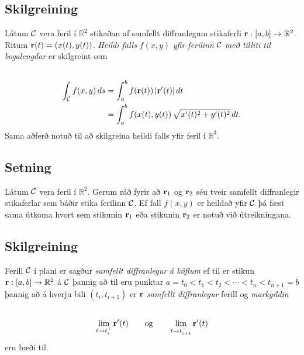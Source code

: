\documentclass[a4paper,10pt,icelandic]{sphinxmanual}
\begin{document}
\subsection{Skilgreining}
\label{Kafli5:id5}
Látum \(\cal C\) vera feril í \({\mathbb  R}^2\) stikaðan af
samfellt diffranlegum stikaferli
\(\mbox{${\bf r}$}:[a,b]\rightarrow{\mathbb  R}^2\). Ritum
\(\mbox{${\bf r}$}(t)=(x(t),y(t))\). \emph{Heildi falls} \(f(x,y)\)
\emph{yfir ferilinn} \(\cal C\) \emph{með tilliti til bogalengdar} er
skilgreint sem
\begin{gather}
\begin{split}\displaystyle\end{split}\notag\\\begin{split}\begin{aligned}
\int_{\cal C}f(x,y)\,ds&=\int_a^b f(\mbox{${\bf r}$}(t))\,|\mbox{${\bf r}$}'(t)|\,dt\\
&=\int_a^b f(x(t),y(t))\,\sqrt{x'(t)^2+y'(t)^2}\,dt.\end{aligned}\end{split}\notag
\end{gather}
Sama aðferð notuð til að skilgreina heildi falls yfir feril í
\({\mathbb  R}^3\).


\subsection{Setning}
\label{Kafli5:id6}
Látum \(\cal C\) vera feril í \({\mathbb  R}^2\). Gerum ráð
fyrir að \(\mbox{${\bf r}$}_1\) og \(\mbox{${\bf r}$}_2\) séu
tveir samfellt diffranlegir stikaferlar sem báðir stika ferilinn
\(\cal C\). Ef fall \(f(x,y)\) er heildað yfir \(\cal C\) þá
fæst sama útkoma hvort sem stikunin \(\mbox{${\bf r}$}_1\) eða
stikunin \(\mbox{${\bf r}$}_2\) er notuð við útreikningana.


\subsection{Skilgreining}
\label{Kafli5:id7}
Ferill \(\cal C\) í plani er sagður \emph{samfellt diffranlegur á köflum}
ef til er stikun
\(\mbox{${\bf r}$}:[a,b]\rightarrow {\mathbb  R}^2\) á
\(\cal C\) þannig að til eru punktar
\(a=t_0<t_1<t_2<\cdots<t_n<t_{n+1}=b\) þannig að á hverju bili
\((t_i,t_{i+1})\) er \(\mbox{${\bf r}$}\) \textit{samfellt diffranlegur}
ferill og \textit{markgildin}
\begin{gather}
\begin{split}\displaystyle\end{split}\notag\\\begin{split}\lim_{t\rightarrow t_i^+}\mbox{${\bf r}$}'(t)\qquad\mbox{og}\qquad
\lim_{t\rightarrow t_{i+1}^-}\mbox{${\bf r}$}'(t)\end{split}\notag
\end{gather}
eru bæði til.
\end{document}
